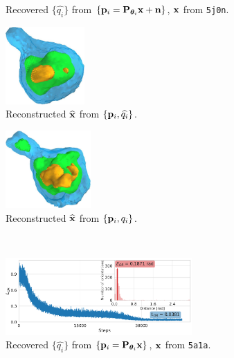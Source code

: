 \begin{figure}[t]
\begin{subfigure}[b]{0.44\linewidth}
        \caption{Recovered $\{ \widehat{q_i} \}$ from $\{ \mathbf{p}_i = \mathbf{P}_{{\boldsymbol{\theta}}_i} \mathbf{x} + \mathbf{n} \}$, $\mathbf{x}$ from \texttt{5j0n}.}%
        \label{fig:5j0n-noise16-orientation-recovery}
    \end{subfigure}
    \hfill
    \begin{subfigure}[b]{0.26\linewidth}
        \centering
        \includegraphics[height=8em]{figures/5j0n_reconstruction_noise16}
        \caption{Reconstructed $\widehat{\mathbf{x}}$ from $\{ \mathbf{p}_i, \widehat{q_i} \}$.}%
        \label{fig:5j0n-noise16-reconstruction-recovered}
    \end{subfigure}
    \hfill
    \begin{subfigure}[b]{0.26\linewidth}
        \centering
        \includegraphics[height=8em]{figures/5j0n_reconstruction_GT_noise16}
        \caption{Reconstructed $\widehat{\mathbf{x}}$ from $\{ \mathbf{p}_i, q_i \}$.}%
        \label{fig:5j0n-noise16-reconstruction-true}
    \end{subfigure}
    \\ \vspace{1em}
    \begin{subfigure}[b]{0.44\linewidth}
        \centering
        \includegraphics[height=8em]{figures/5a1a_noise0_ar_aa}
        \caption{Recovered $\{ \widehat{q_i} \}$ from $\{ \mathbf{p}_i = \mathbf{P}_{{\boldsymbol{\theta}}_i} \mathbf{x} \}$, $\mathbf{x}$ from \texttt{5a1a}.}%
        \label{fig:5a1a-noise0-orientation-recovery}
    \end{subfigure}
    \hfill
    \begin{subfigure}[b]{0.26\linewidth}
        \centering

\end{subfigure}
\end{figure}
